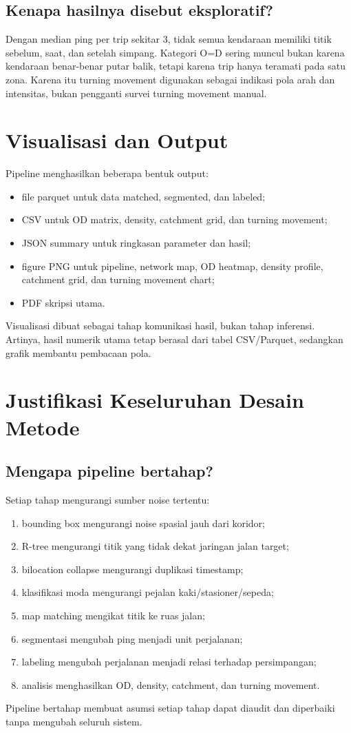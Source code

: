 \documentclass[11pt,a4paper]{article}
\begin{document}
\subsection{Kenapa hasilnya disebut eksploratif?}
Dengan median ping per trip sekitar 3, tidak semua kendaraan memiliki titik sebelum, saat, dan setelah simpang. Kategori O=D sering muncul bukan karena kendaraan benar-benar putar balik, tetapi karena trip hanya teramati pada satu zona. Karena itu turning movement digunakan sebagai indikasi pola arah dan intensitas, bukan pengganti survei turning movement manual.

\section{Visualisasi dan Output}
Pipeline menghasilkan beberapa bentuk output:
\begin{itemize}
    \item file parquet untuk data matched, segmented, dan labeled;
    \item CSV untuk OD matrix, density, catchment grid, dan turning movement;
    \item JSON summary untuk ringkasan parameter dan hasil;
    \item figure PNG untuk pipeline, network map, OD heatmap, density profile, catchment grid, dan turning movement chart;
    \item PDF skripsi utama.
\end{itemize}

Visualisasi dibuat sebagai tahap komunikasi hasil, bukan tahap inferensi. Artinya, hasil numerik utama tetap berasal dari tabel CSV/Parquet, sedangkan grafik membantu pembacaan pola.

\section{Justifikasi Keseluruhan Desain Metode}
\subsection{Mengapa pipeline bertahap?}
Setiap tahap mengurangi sumber noise tertentu:
\begin{enumerate}
    \item bounding box mengurangi noise spasial jauh dari koridor;
    \item R-tree mengurangi titik yang tidak dekat jaringan jalan target;
    \item bilocation collapse mengurangi duplikasi timestamp;
    \item klasifikasi moda mengurangi pejalan kaki/stasioner/sepeda;
    \item map matching mengikat titik ke ruas jalan;
    \item segmentasi mengubah ping menjadi unit perjalanan;
    \item labeling mengubah perjalanan menjadi relasi terhadap persimpangan;
    \item analisis menghasilkan OD, density, catchment, dan turning movement.
\end{enumerate}
Pipeline bertahap membuat asumsi setiap tahap dapat diaudit dan diperbaiki tanpa mengubah seluruh sistem.
\end{document}
